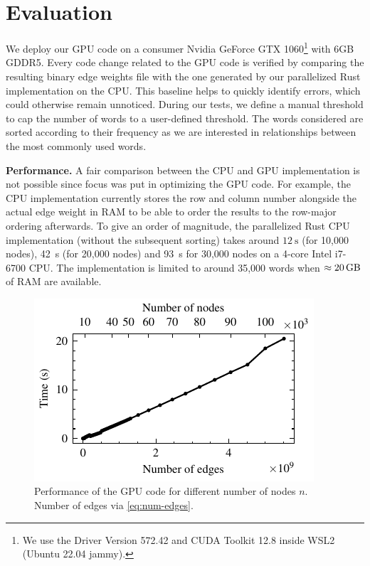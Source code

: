 \section{Evaluation}
\label{sec:eval}

We deploy our GPU code on a consumer Nvidia GeForce GTX 1060\footnote{We use the Driver Version 572.42 and CUDA Toolkit 12.8 inside WSL2 (Ubuntu 22.04 jammy).} with 6GB GDDR5. Every code change related to the GPU code is verified by comparing the resulting binary edge weights file with the one generated by our parallelized Rust implementation on the CPU. This baseline helps to quickly identify errors, which could otherwise remain unnoticed. During our tests, we define a manual threshold to cap the number of words to a user-defined threshold. The words considered are sorted according to their frequency as we are interested in relationships between the most commonly used words.

\textbf{Performance.} A fair comparison between the CPU and GPU implementation is not possible since focus was put in optimizing the GPU code. For example, the CPU implementation currently stores the row and column number alongside the actual edge weight in RAM to be able to order the results to the row-major ordering afterwards. To give an order of magnitude, the parallelized Rust CPU implementation (without the subsequent sorting) takes around $\qty{12}{\s}$ (for 10,000 nodes), \qty{42}{\s} (for 20,000 nodes) and \qty{93}{\s} for 30,000 nodes on a 4-core Intel i7-6700 CPU. The implementation is limited to around 35,000 words when $\approx\qty{20}{\giga\byte}$ of RAM are available.

\begin{figure}[H]
    \centering
    \includegraphics[width=\linewidth]{assets/timing.pdf}
    \caption{Performance of the GPU code for different number of nodes $n$. Number of edges via \eqref{eq:num-edges}.}
    \label{fig:timing}
\end{figure}

